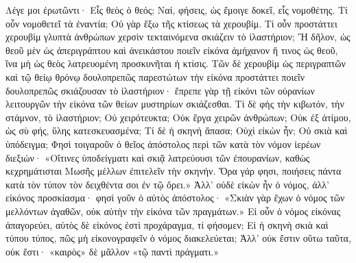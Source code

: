 \documentclass[10pt]{book}
\newcommand{\switchenglish}{\selectlanguage{english} \switchcolumn}
\begin{document}
\begin{paracol}{2}
Λέγε μοι ἐρωτῶντι· Εἷς θεὸς ὁ θεός; Ναί, φήσεις, ὡς ἔμοιγε δοκεῖ, εἷς νομοθέτης.
Τί οὖν νομοθετεῖ τὰ ἐναντία; Οὐ γὰρ ἔξω τῆς κτίσεως τὰ χερουβίμ.
Τί οὖν προστάττει χερουβὶμ γλυπτὰ ἀνθρώπων χερσὶν τεκταινόμενα σκιάζειν τὸ ἱλαστήριον; Ἢ δῆλον, ὡς θεοῦ μὲν ὡς ἀπεριγράπτου καὶ ἀνεικάστου ποιεῖν εἰκόνα ἀμήχανον ἤ τινος ὡς θεοῦ, ἵνα μὴ ὡς θεὸς λατρευομένη προσκυνῆται ἡ κτίσις.
Τῶν δὲ χερουβὶμ ὡς περιγραπτῶν καὶ τῷ θείῳ θρόνῳ δουλοπρεπῶς παρεστώτων τὴν εἰκόνα προστάττει ποιεῖν δουλοπρεπῶς σκιάζουσαν τὸ ἱλαστήριον· ἔπρεπε γὰρ τῇ εἰκόνι τῶν οὐρανίων λειτουργῶν τὴν εἰκόνα τῶν θείων μυστηρίων σκιάζεσθαι.
Τί δὲ φὴς τὴν κιβωτόν, τὴν στάμνον, τὸ ἱλαστήριον; Οὐ χειρότευκτα; Οὐκ ἔργα χειρῶν ἀνθρώπων; Οὐκ ἐξ ἀτίμου, ὡς σὺ φής, ὕλης κατεσκευασμένα; Τί δὲ ἡ σκηνὴ ἅπασα; Οὐχὶ εἰκὼν ἦν; Οὐ σκιὰ καὶ ὑπόδειγμα; Φησὶ τοιγαροῦν ὁ θεῖος ἀπόστολος περὶ τῶν κατὰ τὸν νόμον ἱερέων διεξιών· «Οἵτινες ὑποδείγματι καὶ σκιᾷ λατρεύουσι τῶν ἐπουρανίων, καθὼς κεχρημάτισται Μωσῆς μέλλων ἐπιτελεῖν τὴν σκηνήν.
Ὅρα γάρ φησι, ποιήσεις πάντα κατὰ τὸν τύπον τὸν δειχθέντα σοι ἐν τῷ ὄρει.» Ἀλλ’ οὐδὲ εἰκὼν ἦν ὁ νόμος, ἀλλ’ εἰκόνος προσκίασμα· φησὶ γοῦν ὁ αὐτὸς ἀπόστολος· «Σκιὰν γὰρ ἔχων ὁ νόμος τῶν μελλόντων ἀγαθῶν, οὐκ αὐτὴν τὴν εἰκόνα τῶν πραγμάτων.» Εἰ οὖν ὁ νόμος εἰκόνας ἀπαγορεύει, αὐτὸς δὲ εἰκόνος ἐστὶ προχάραγμα, τί φήσομεν; Εἰ ἡ σκηνὴ σκιὰ καὶ τύπου τύπος, πῶς μὴ εἰκονογραφεῖν ὁ νόμος διακελεύεται; Ἀλλ’ οὐκ ἔστιν οὕτω ταῦτα, οὐκ ἔστι· «καιρὸς» δὲ μᾶλλον «τῷ παντὶ πράγματι.»

\switchenglish



\end{paracol}
\end{document}
